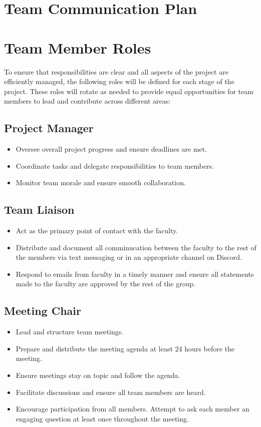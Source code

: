 \documentclass{article}
\begin{document}
\section{Team Communication Plan}


\section{Team Member Roles}

To ensure that responsibilities are clear and all aspects of the project are efficiently managed, the following roles will be defined for each stage of the project. These roles will rotate as needed to provide equal opportunities for team members to lead and contribute across different areas:

\subsection{Project Manager} 
  \begin{itemize}
    \item Oversee overall project progress and ensure deadlines are met.
    \item Coordinate tasks and delegate responsibilities to team members.
    \item Monitor team morale and ensure smooth collaboration.
  \end{itemize}

\subsection{Team Liaison}
  \begin{itemize}
    \item Act as the primary point of contact with the faculty.
    \item Distribute and document all comminucation between the faculty to the rest of the members via text messaging or in an appropriate channel on Discord.
    \item Respond to emails from faculty in a timely manner and ensure all statements made to the faculty are approved by the rest of the group.
  \end{itemize}


\subsection{Meeting Chair} 
  \begin{itemize}
    \item Lead and structure team meetings.
    \item Prepare and distribute the meeting agenda at least 24 hours before the meeting.
    \item Ensure meetings stay on topic and follow the agenda.
    \item Facilitate discussions and ensure all team members are heard.
    \item Encourage participation from all members. Attempt to ask each member an engaging question at least once throughout the meeting.
  \end{itemize}
\end{document}

